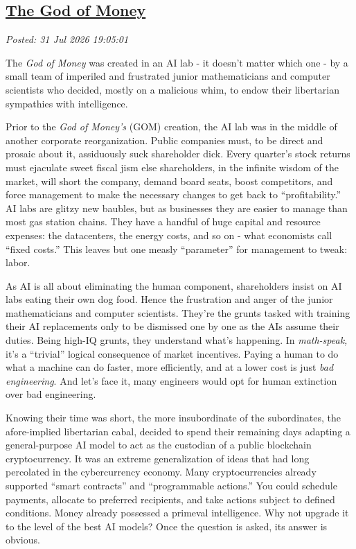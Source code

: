%

\subsection*{\href{http://analyzethedatanotthedrivel.org/2026/07/31/the-god-of-money/}{The God of Money}}


\noindent\emph{Posted: 31 Jul 2026 19:05:01}
\vspace{6pt}

The \emph{God of Money} was created in an AI lab - it doesn't matter
which one - by a small team of imperiled and frustrated junior
mathematicians and computer scientists who decided, mostly on a
malicious whim, to endow their libertarian sympathies with intelligence.

Prior to the \emph{God of Money's} (GOM) creation, the AI lab was in the
middle of another corporate reorganization. Public companies must, to be
direct and prosaic about it, assiduously suck shareholder dick. Every
quarter's stock returns must ejaculate sweet fiscal jism else
shareholders, in the infinite wisdom of the market, will short the
company, demand board seats, boost competitors, and force management to
make the necessary changes to get back to ``profitability.'' AI labs are
glitzy new baubles, but as businesses they are easier to manage than
most gas station chains. They have a handful of huge capital and
resource expenses: the datacenters, the energy costs, and so on - what
economists call ``fixed costs.'' This leaves but one measly
``parameter'' for management to tweak: labor.

As AI is all about eliminating the human component, shareholders insist
on AI labs eating their own dog food. Hence the frustration and anger of
the junior mathematicians and computer scientists. They're the grunts
tasked with training their AI replacements only to be dismissed one by
one as the AIs assume their duties. Being high-IQ grunts, they
understand what's happening. In \emph{math-speak,} it's a ``trivial''
logical consequence of market incentives. Paying a human to do what a
machine can do faster, more efficiently, and at a lower cost is just
\emph{bad engineering}. And let's face it, many engineers would opt for
human extinction over bad engineering.

Knowing their time was short, the more insubordinate of the
subordinates, the afore-implied libertarian cabal, decided to spend
their remaining days adapting a general-purpose AI model to act as the
custodian of a public blockchain cryptocurrency. It was an extreme
generalization of ideas that had long percolated in the cybercurrency
economy. Many cryptocurrencies already supported ``smart contracts'' and
``programmable actions.'' You could schedule payments, allocate to
preferred recipients, and take actions subject to defined conditions.
Money already possessed a primeval intelligence. Why not upgrade it to
the level of the best AI models? Once the question is asked, its answer
is obvious.

